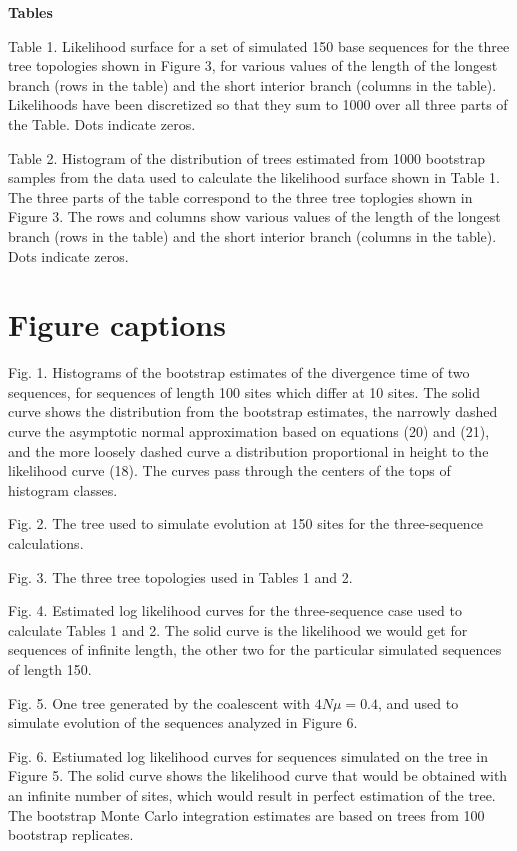 \newpage
{\parindent=0in
\centerline{\bf Tables}

Table 1.  Likelihood surface for a set of simulated 150 base sequences for
the three tree topologies shown in Figure 3, for various values of the length
of the longest branch (rows in the table) and the short interior
branch (columns in the table).  Likelihoods have been discretized so that
they sum to 1000 over all three parts of the Table.  Dots indicate zeros.

\newpage

Table 2.  Histogram of the distribution of trees estimated from 1000
bootstrap samples from the
data used to calculate the likelihood surface shown in Table 1.  The
three parts of the table correspond to the three tree toplogies shown in
Figure 3.  The rows and columns show various values of the length
of the longest branch (rows in the table) and the short interior
branch (columns in the table).  Dots indicate zeros.
\newpage

\section*{Figure captions}

Fig. 1.  Histograms of the bootstrap estimates of the divergence time of
two sequences, for sequences of length 100 sites which differ at 10 sites.
The solid curve shows the distribution from the bootstrap estimates,
the narrowly dashed curve the asymptotic normal approximation based on
equations (20) and (21), and the
more loosely dashed curve a distribution proportional in height to the
likelihood curve (18).  The curves pass through the centers of the tops of
histogram classes.
\bigskip

Fig. 2.  The tree used to simulate evolution at 150 sites for the
three-sequence calculations.
\bigskip

Fig. 3.  The three tree topologies used in Tables 1 and 2.
\bigskip

Fig. 4.  Estimated log likelihood curves for the three-sequence case used to
calculate Tables 1 and 2.  The solid curve is the likelihood we would get
for sequences of infinite length, the other two for the particular
simulated sequences of length 150.
\bigskip

Fig. 5.  One tree generated by the coalescent with $4N\mu = 0.4$, and used to
simulate evolution of the sequences analyzed in Figure 6.
\bigskip

Fig. 6.  Estiumated log likelihood curves for sequences simulated on the tree
in Figure 5.  The solid curve shows the likelihood curve that would be obtained
with an infinite number of sites, which would result in perfect estimation
of the tree.  The bootstrap Monte Carlo integration estimates are based on
trees from 100 bootstrap replicates.
\bigskip

}
